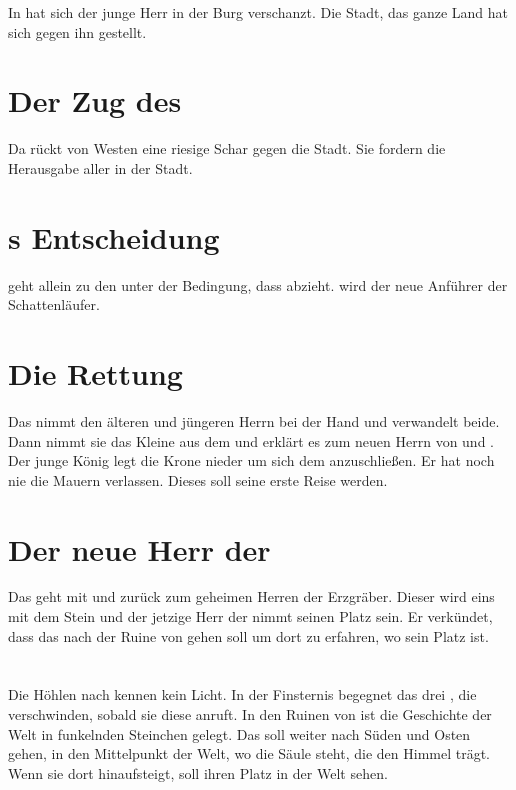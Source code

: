 \begin{huge}
In \Rhingell hat sich der junge Herr in der Burg verschanzt. Die Stadt, das ganze Land hat sich gegen ihn gestellt. 

\section{Der Zug des \Papato}
Da rückt von Westen eine riesige Schar \Bangiri gegen die Stadt. Sie fordern die Herausgabe aller \Schattenjager in der Stadt.

\section{{\Eno}s Entscheidung}
\Eno geht allein zu den \Bangiri unter der Bedingung, dass \Papato abzieht. \Nox wird der neue Anführer der Schattenläufer.

\section{Die Rettung }
Das \Sturmkind nimmt den älteren und jüngeren Herrn bei der Hand und verwandelt beide. Dann nimmt sie das Kleine aus dem \Riesenwald und erklärt es zum neuen Herrn von \Rhingell und \Grunland. Der junge König legt die Krone nieder um sich dem \Sturmkind anzuschließen. Er hat noch nie die Mauern  verlassen. Dieses soll seine erste Reise werden.

\section{Der neue Herr der \Eisenmeister}
Das \Sturmkind geht mit \Safir und \Umbra zurück zum geheimen Herren der Erzgräber. Dieser wird eins mit dem Stein und der jetzige Herr der \Eisenmeister nimmt seinen Platz sein. Er verkündet, dass das \Sturmkind nach der Ruine von \Darmon gehen soll um dort zu erfahren, wo sein Platz ist.

\section{\Darmon}
Die Höhlen nach \Darmon kennen kein Licht. In der Finsternis begegnet das \Sturmkind drei \Daimon, die verschwinden, sobald sie diese anruft.
In den Ruinen von \Darmon ist die Geschichte der Welt in funkelnden Steinchen gelegt. Das \Sturmkind soll weiter nach Süden und Osten gehen, in den Mittelpunkt der Welt, wo die Säule steht, die den Himmel trägt. Wenn sie dort hinaufsteigt, soll ihren Platz in der Welt sehen.

\end{huge}

